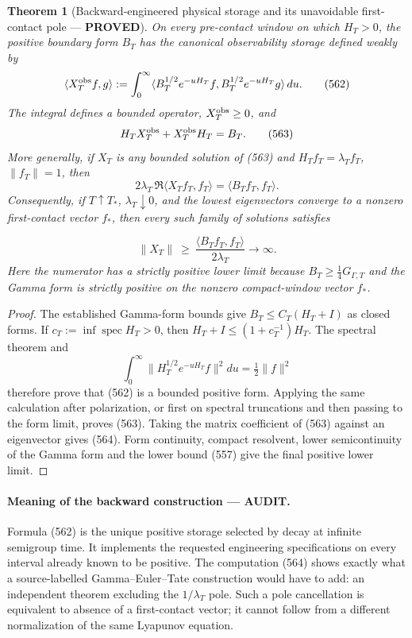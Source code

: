 \documentclass[11pt]{article}
\newtheorem{theorem}{Theorem}
\newcommand{\PROVED}{\textcolor{green!45!black}{\textbf{PROVED}}}
\newcommand{\AUDIT}{\textcolor{orange!75!black}{\textbf{AUDIT}}}
\begin{document}
\begin{theorem}[Backward-engineered physical storage and its unavoidable
first-contact pole --- \PROVED]
On every pre-contact window on which \(H_T>0\), the positive boundary form
\(B_T\) has the canonical observability storage defined weakly by
\begin{equation}
 \langle X_T^{\rm obs}f,g\rangle:=\int_0^\infty
 \langle B_T^{1/2}e^{-uH_T}f,
         B_T^{1/2}e^{-uH_T}g\rangle\,du .             \tag{562}
\end{equation}
The integral defines a bounded operator, \(X_T^{\rm obs}\ge0\), and
\begin{equation}
 H_TX_T^{\rm obs}+X_T^{\rm obs}H_T=B_T.              \tag{563}
\end{equation}
More generally, if \(X_T\) is any bounded solution of (563) and
\(H_Tf_T=\lambda_Tf_T\), \(\|f_T\|=1\), then
\begin{equation}
 2\lambda_T\,\Re\langle X_Tf_T,f_T\rangle
 =\langle B_Tf_T,f_T\rangle .                        \tag{564}
\end{equation}
Consequently, if \(T\uparrow T_*\), \(\lambda_T\downarrow0\), and the
lowest eigenvectors converge to a nonzero first-contact vector \(f_*\),
then every such family of solutions satisfies

\[
 \|X_T\|\ \ge\
 \frac{\langle B_Tf_T,f_T\rangle}{2\lambda_T}
 \longrightarrow\infty .
\]
Here the numerator has a strictly positive lower limit because
\(B_T\ge\frac14G_{\Gamma,T}\) and the Gamma form is strictly positive on
the nonzero compact-window vector \(f_*\).
\end{theorem}

\begin{proof}
The established Gamma-form bounds give \(B_T\le C_T(H_T+I)\) as closed
forms.  If \(c_T:=\inf\operatorname{spec}H_T>0\), then
\(H_T+I\le(1+c_T^{-1})H_T\).  The spectral theorem and
\[
 \int_0^\infty
 \|H_T^{1/2}e^{-uH_T}f\|^2du=\tfrac12\|f\|^2
\]
therefore prove that (562) is a bounded positive form.  Applying the same
calculation after polarization, or first on spectral truncations and then
passing to the form limit, proves (563).  Taking the matrix
coefficient of (563) against an eigenvector gives (564).  Form continuity,
compact resolvent, lower semicontinuity of the Gamma form and the lower
bound (557) give the final positive lower limit.
\end{proof}

\paragraph{Meaning of the backward construction --- \AUDIT.}
Formula (562) is the unique positive storage selected by decay at infinite
semigroup time.  It implements the requested engineering specifications on
every interval already known to be positive.  The computation (564) shows
exactly what a source-labelled Gamma--Euler--Tate construction would have
to add: an independent theorem excluding the \(1/\lambda_T\) pole.  Such a
pole cancellation is equivalent to absence of a first-contact vector; it
cannot follow from a different normalization of the same Lyapunov
equation.
\end{document}
